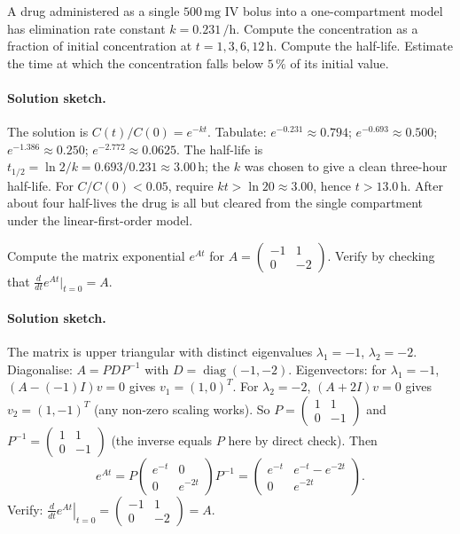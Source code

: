 \begin{exercise}
A drug administered as a single $500\,\si{\milli\gram}$ IV bolus
into a one-compartment model has elimination rate constant
$k = 0.231\,\si{\per\hour}$. Compute the concentration as a
fraction of initial concentration at $t = 1, 3, 6,
12\,\si{\hour}$. Compute the half-life. Estimate the time at
which the concentration falls below $5\,\%$ of its initial value.

\paragraph{Solution sketch.} The solution is $C(t)/C(0) = e^{-k
t}$. Tabulate: $e^{-0.231} \approx 0.794$; $e^{-0.693} \approx
0.500$; $e^{-1.386} \approx 0.250$; $e^{-2.772} \approx 0.0625$.
The half-life is $t_{1/2} = \ln 2 / k = 0.693 / 0.231 \approx
3.00\,\si{\hour}$; the $k$ was chosen to give a clean
three-hour half-life. For $C/C(0) < 0.05$, require $k t > \ln 20
\approx 3.00$, hence $t > 13.0\,\si{\hour}$. After about four
half-lives the drug is all but cleared from the single
compartment under the linear-first-order model.
\end{exercise}

\begin{exercise}
Compute the matrix exponential $e^{A t}$ for $A = \begin{pmatrix}
-1 & 1 \\ 0 & -2 \end{pmatrix}$. Verify by checking that
$\frac{d}{dt}e^{A t}\bigl|_{t=0} = A$.

\paragraph{Solution sketch.} The matrix is upper triangular with
distinct eigenvalues $\lambda_{1} = -1$, $\lambda_{2} = -2$.
Diagonalise: $A = P D P^{-1}$ with $D = \operatorname{diag}(-1,
-2)$. Eigenvectors: for $\lambda_{1} = -1$, $(A - (-1)I)v = 0$
gives $v_{1} = (1, 0)^{T}$. For $\lambda_{2} = -2$, $(A + 2 I) v
= 0$ gives $v_{2} = (1, -1)^{T}$ (any non-zero scaling works).
So $P = \begin{pmatrix} 1 & 1 \\ 0 & -1 \end{pmatrix}$ and $P^{-1}
= \begin{pmatrix} 1 & 1 \\ 0 & -1 \end{pmatrix}$ (the inverse
equals $P$ here by direct check). Then
\[
e^{A t} = P \begin{pmatrix} e^{-t} & 0 \\ 0 & e^{-2 t}
\end{pmatrix} P^{-1} = \begin{pmatrix} e^{-t} & e^{-t} - e^{-2 t}
\\ 0 & e^{-2 t} \end{pmatrix}.
\]
Verify: $\left.\frac{d}{dt}e^{A t}\right|_{t = 0} =
\begin{pmatrix} -1 & 1 \\ 0 & -2 \end{pmatrix} = A$. \checkmark
\end{exercise}

